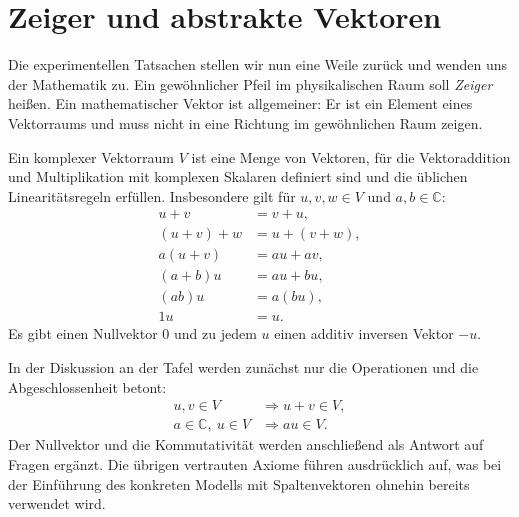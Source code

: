 \begin{classroomqa}
\end{classroomqa}

\begin{classroomqa}
\end{classroomqa}

\section{Zeiger und abstrakte Vektoren}

Die experimentellen Tatsachen stellen wir nun eine Weile zurück und wenden uns der Mathematik zu. Ein gewöhnlicher Pfeil im physikalischen Raum soll \emph{Zeiger} heißen. Ein mathematischer Vektor ist allgemeiner: Er ist ein Element eines Vektorraums und muss nicht in eine Richtung im gewöhnlichen Raum zeigen.

\begin{definition}Ein komplexer Vektorraum \(V\) ist eine Menge von Vektoren, für die Vektoraddition und Multiplikation mit komplexen Skalaren definiert sind und die üblichen Linearitätsregeln erfüllen. Insbesondere gilt für \(u,v,w\in V\) und \(a,b\in\mathbb C\):
\begin{align}
  u+v&=v+u,\\
  (u+v)+w&=u+(v+w),\\
  a(u+v)&=au+av,\\
  (a+b)u&=au+bu,\\
  (ab)u&=a(bu),\\
  1u&=u.
\end{align}
Es gibt einen Nullvektor \(0\) und zu jedem \(u\) einen additiv inversen Vektor \(-u\).
\end{definition}

In der Diskussion an der Tafel werden zunächst nur die Operationen und die Abgeschlossenheit betont:
\begin{equation}
\begin{aligned}
  u,v\in V&\Longrightarrow u+v\in V,\\
  a\in\mathbb C,\ u\in V&\Longrightarrow au\in V.
\end{aligned}
\end{equation}
Der Nullvektor und die Kommutativität werden anschließend als Antwort auf Fragen ergänzt. Die übrigen vertrauten Axiome führen ausdrücklich auf, was bei der Einführung des konkreten Modells mit Spaltenvektoren ohnehin bereits verwendet wird.

